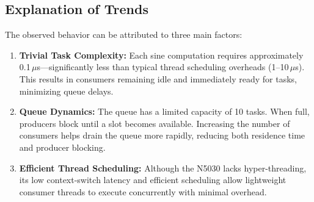 \documentclass{article}
\begin{document}
\subsection{Explanation of Trends}
The observed behavior can be attributed to three main factors:

\begin{enumerate}
    \item \textbf{Trivial Task Complexity:} Each sine computation requires approximately 0.1\,$\mu$s—significantly less than typical thread scheduling overheads (1--10\,$\mu$s). This results in consumers remaining idle and immediately ready for tasks, minimizing queue delays.
    \item \textbf{Queue Dynamics:} The queue has a limited capacity of 10 tasks. When full, producers block until a slot becomes available. Increasing the number of consumers helps drain the queue more rapidly, reducing both residence time and producer blocking.
    \item \textbf{Efficient Thread Scheduling:} Although the N5030 lacks hyper-threading, its low context-switch latency and efficient scheduling allow lightweight consumer threads to execute concurrently with minimal overhead.
\end{enumerate}
\end{document}

